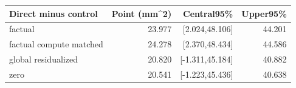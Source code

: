 \begin{tabular}{lrrr}
\toprule
Direct minus control & Point (mm\textasciicircum{}2) & Central95\% & Upper95\%\\
\midrule
factual & 23.977 & [2.024,48.106] & 44.201\\
factual compute matched & 24.278 & [2.370,48.434] & 44.586\\
global residualized & 20.820 & [-1.311,45.184] & 40.882\\
zero & 20.541 & [-1.223,45.436] & 40.638\\
\bottomrule
\end{tabular}
